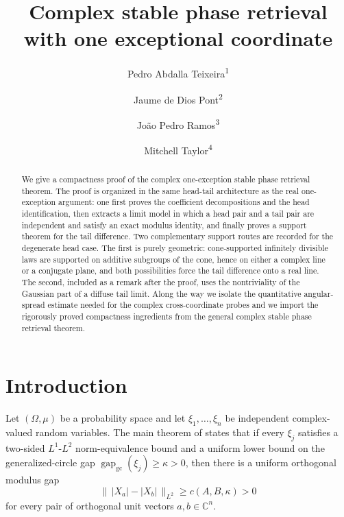 \documentclass[11pt]{amsart}
\title{Complex stable phase retrieval with one exceptional coordinate}
\author{Pedro Abdalla Teixeira\textsuperscript{1}}
\author{Jaume de Dios Pont\textsuperscript{2}}
\author{Jo\~ao Pedro Ramos\textsuperscript{3}}
\author{Mitchell Taylor\textsuperscript{4}}
\newcommand{\C}{\mathbb{C}}
\newcommand{\gapgc}{\operatorname{gap}_{\mathrm{gc}}}
\begin{document}
\begin{abstract}
We give a compactness proof of the complex one-exception stable phase retrieval
theorem.  The proof is organized in the same head-tail architecture as the real
one-exception argument: one first proves the coefficient decompositions and the
head identification, then extracts a limit model in which a head pair and a
tail pair are independent and satisfy an exact modulus identity, and finally
proves a support theorem for the tail difference.  Two complementary support
routes are recorded for the degenerate head case.  The first is purely
geometric: cone-supported infinitely divisible laws are supported on additive
subgroups of the cone, hence on either a complex line or a conjugate plane, and
both possibilities force the tail difference onto a real line.  The second,
included as a remark after the proof, uses the nontriviality of the Gaussian
part of a diffuse tail limit.  Along the way we isolate the quantitative
angular-spread estimate needed for the complex cross-coordinate probes and we
import the rigorously proved compactness ingredients from the general complex
stable phase retrieval theorem.
\end{abstract}
\maketitle
\begingroup
\renewcommand{\thefootnote}{\arabic{footnote}}
\endgroup
\setcounter{footnote}{0}

\section{Introduction}

Let $(\Omega,\mu)$ be a probability space and let $\xi_1,\ldots,\xi_n$ be
independent complex-valued random variables.  The main theorem of
\cite{complex_spr} states that if every $\xi_j$ satisfies a two-sided
$L^1$-$L^2$ norm-equivalence bound and a uniform lower bound on the
generalized-circle gap $\gapgc(\xi_j)\ge \kappa>0$, then there is a uniform
orthogonal modulus gap
\[
  \bigl\|\,|X_a|-|X_b|\,\bigr\|_{L^2} \ge c(A,B,\kappa)>0
\]
for every pair of orthogonal unit vectors $a,b\in\C^n$.
\end{document}
